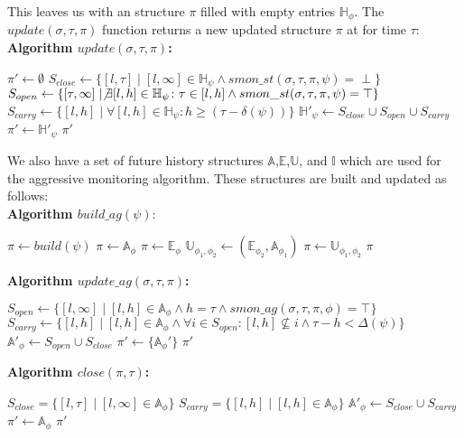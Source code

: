 \documentclass[10pt,a4paper]{article}
\begin{document}
This leaves us with an structure $\pi$ filled with empty entries $\mathbb{H}_{\phi}$. The $update(\sigma, \tau, \pi)$ function returns a new updated structure $\pi$ at for time $\tau$:
%
\\ \textbf{Algorithm $update(\sigma, \tau, \pi)$:}
\begin{algorithmic}
\STATE $\pi' \leftarrow \emptyset$
\STATE $S_{close} \leftarrow \{ [l, \tau] \mid  [l,\infty] \in \mathbb{H}_{\psi} \wedge smon\_st(\sigma, \tau, \pi, \psi) = \perp \}$
\STATE $S_{open} \leftarrow \{ [\tau, \infty] \mid \not\exists [l,h] \in \mathbb{H}_{\psi} \colon \tau \in [l,h] \wedge smon\_st(\sigma, \tau,\pi,\psi) = \top \}$
\STATE $S_{carry} \leftarrow \{ [l, h] \mid \forall [l,h] \in \mathbb{H}_{\psi} \colon h \geq (\tau - \delta(\psi)) \}$
\STATE $\mathbb{H}'_{\psi} \leftarrow S_{close} \cup S_{open} \cup S_{carry}$
\STATE $\pi' \leftarrow \mathbb{H}'_{\psi}$
\ENDFOR
\RETURN $\pi'$
\end{algorithmic}

We also have a set of future history structures $\mathbb{A}$,$\mathbb{E}$,$\mathbb{U}$, and $\mathbb{I}$ which are used for the aggressive monitoring algorithm. These structures are built and updated as follows:
%
\\ \textbf{Algorithm $build\_ag(\psi)$}:
\begin{algorithmic}
\STATE $\pi \leftarrow build(\psi)$
\IF{$\Psi \equiv \square_{[l,H]} \phi$}
\STATE $\pi \leftarrow \mathbb{A}_{\phi}$
\ENDIF
\IF{$\Psi \equiv \lozenge_{[l,h]} \phi$}
\STATE $\pi \leftarrow \mathbb{E}_{\phi}$
\ENDIF
{}
\STATE $\mathbb{U}_{\phi_1,\phi_2} \leftarrow (\mathbb{E}_{\phi_2}, \mathbb{A}_{\phi_1})$
\STATE $\pi \leftarrow \mathbb{U}_{\phi_1,\phi_2}$
\ENDIF
\ENDFOR
\RETURN $\pi$
\end{algorithmic}
\textbf{Algorithm $update\_ag(\sigma, \tau, \pi)$:}
\begin{algorithmic}
\STATE {}
\STATE $S_{open} \leftarrow \{ [l, \infty] \mid [l,h] \in \mathbb{A}_{\phi} \wedge h = \tau \wedge smon\_ag(\sigma, \tau, \pi, \phi) = \top \}$
\STATE $S_{carry} \leftarrow \{ [l, h] \mid [l,h] \in \mathbb{A}_{\phi} \wedge \forall i \in S_{open} \colon [l,h] \not\subseteq i \wedge \tau-h < \Delta(\psi) \}$
\STATE $\mathbb{A}'_{\phi} \leftarrow S_{open} \cup S_{close}$
\STATE $\pi' \leftarrow \{ \mathbb{A}_{\phi}' \}$
\ENDFOR
\STATE {}
\STATE {}
\RETURN $\pi'$
\end{algorithmic}
\textbf{Algorithm $close(\pi, \tau)$:}
\begin{algorithmic}
\STATE $S_{close} = \{ [l, \tau] \mid [l, \infty] \in \mathbb{A}_{\phi} \}$
\STATE $S_{carry} = \{ [l, h] \mid [l, h] \in \mathbb{A}_{\phi} \}$
\STATE $\mathbb{A}'_{\phi} \leftarrow S_{close} \cup S_{carry}$
\STATE $\pi' \leftarrow \mathbb{A}_{\phi}$
\ENDFOR
\RETURN $\pi'$
\STATE {}
\end{algorithmic}
\end{document}

